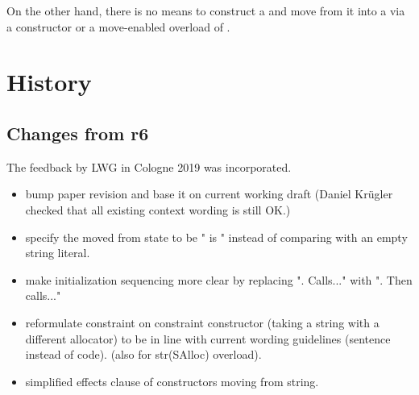 \documentclass[ebook,11pt,article]{memoir}
\begin{document}
On the other hand, there is no means to construct a  and move from it into a  via a constructor or a move-enabled overload of .

\section{History}
\subsection{Changes from r6}
The feedback by LWG in Cologne 2019 was incorporated.
\begin{itemize}
\item bump paper revision and base it on current working draft  (Daniel Krügler checked that all existing context wording is still OK.)
\item specify the moved from state to be " is " instead of comparing with an empty string literal.
\item make initialization sequencing more clear by replacing ". Calls..." with ". Then calls..."
\item reformulate constraint on constraint constructor (taking a string with a different allocator) to be in line with current wording guidelines (sentence instead of code). (also for str(SAlloc) overload).
\item simplified effects clause of constructors moving from string.
\end{itemize}
\end{document}
